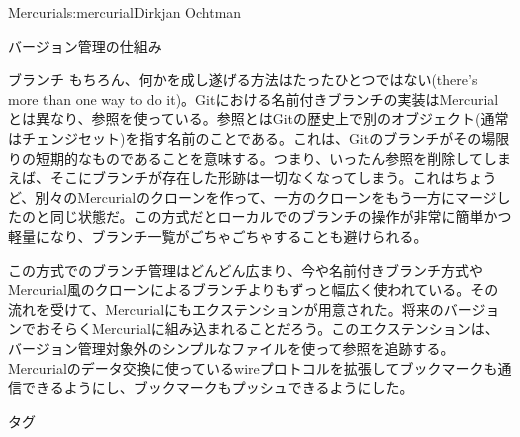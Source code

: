 \begin{aosachapter}{Mercurial}{s:mercurial}{Dirkjan Ochtman}
\begin{aosasect1}{バージョン管理の仕組み}
\begin{aosasect2}{ブランチ}
もちろん、何かを成し遂げる方法はたったひとつではない(there's more than one way to do it)。Gitにおける名前付きブランチの実装はMercurialとは異なり、参照を使っている。参照とはGitの歴史上で別のオブジェクト(通常はチェンジセット)を指す名前のことである。これは、Gitのブランチがその場限りの短期的なものであることを意味する。つまり、いったん参照を削除してしまえば、そこにブランチが存在した形跡は一切なくなってしまう。これはちょうど、別々のMercurialのクローンを作って、一方のクローンをもう一方にマージしたのと同じ状態だ。この方式だとローカルでのブランチの操作が非常に簡単かつ軽量になり、ブランチ一覧がごちゃごちゃすることも避けられる。

この方式でのブランチ管理はどんどん広まり、今や名前付きブランチ方式やMercurial風のクローンによるブランチよりもずっと幅広く使われている。その流れを受けて、Mercurialにもエクステンションが用意された。将来のバージョンでおそらくMercurialに組み込まれることだろう。このエクステンションは、バージョン管理対象外のシンプルなファイルを使って参照を追跡する。Mercurialのデータ交換に使っているwireプロトコルを拡張してブックマークも通信できるようにし、ブックマークもプッシュできるようにした。

\end{aosasect2}

\begin{aosasect2}{タグ}


\end{aosasect2}
\end{aosasect1}
\end{aosachapter}
